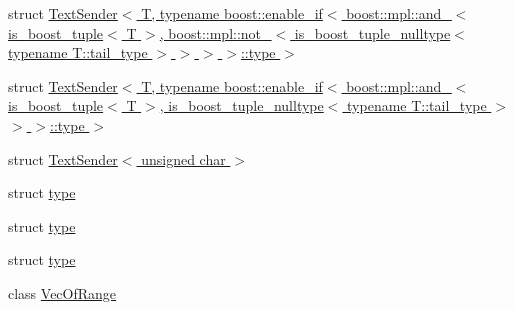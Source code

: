 \begin{DoxyCompactItemize}
struct \hyperlink{structgnuplotio_1_1_text_sender_3_01_t_00_01typename_01boost_1_1enable__if_3_01boost_1_1mpl_1_1ad1ac3a3da167856c52be6ae54ba2c114}{Text\+Sender$<$ T, typename boost\+::enable\+\_\+if$<$ boost\+::mpl\+::and\+\_\+$<$ is\+\_\+boost\+\_\+tuple$<$ T $>$, boost\+::mpl\+::not\+\_\+$<$ is\+\_\+boost\+\_\+tuple\+\_\+nulltype$<$ typename T\+::tail\+\_\+type $>$ $>$ $>$ $>$\+::type $>$}
\item 
struct \hyperlink{structgnuplotio_1_1_text_sender_3_01_t_00_01typename_01boost_1_1enable__if_3_01boost_1_1mpl_1_1ab6d6864cc1b3ed233c9f15134694f953}{Text\+Sender$<$ T, typename boost\+::enable\+\_\+if$<$ boost\+::mpl\+::and\+\_\+$<$ is\+\_\+boost\+\_\+tuple$<$ T $>$, is\+\_\+boost\+\_\+tuple\+\_\+nulltype$<$ typename T\+::tail\+\_\+type $>$ $>$ $>$\+::type $>$}
\item 
struct \hyperlink{structgnuplotio_1_1_text_sender_3_01unsigned_01char_01_4}{Text\+Sender$<$ unsigned char $>$}
\item 
struct \hyperlink{structgnuplotio_1_1_mode_auto_decoder_3_01_t_00_01typename_01boost_1_1enable__if__c_3_01_07_arra8faa7fb46cef74a29a23f22c000e4a99}{type}
\item 
struct \hyperlink{structgnuplotio_1_1_mode_auto_decoder_3_01_t_00_01typename_01boost_1_1enable__if__c_3_01_07_arra33ab7f3325313485a7f29355d9a819fc}{type}
\item 
struct \hyperlink{structgnuplotio_1_1_mode_auto_decoder_3_01_t_00_01typename_01boost_1_1enable__if__c_3_01_07_arraea646779afc1e35efaeffcebe81e18a0}{type}
\item 
class \hyperlink{classgnuplotio_1_1_vec_of_range}{Vec\+Of\+Range}
\end{DoxyCompactItemize}
